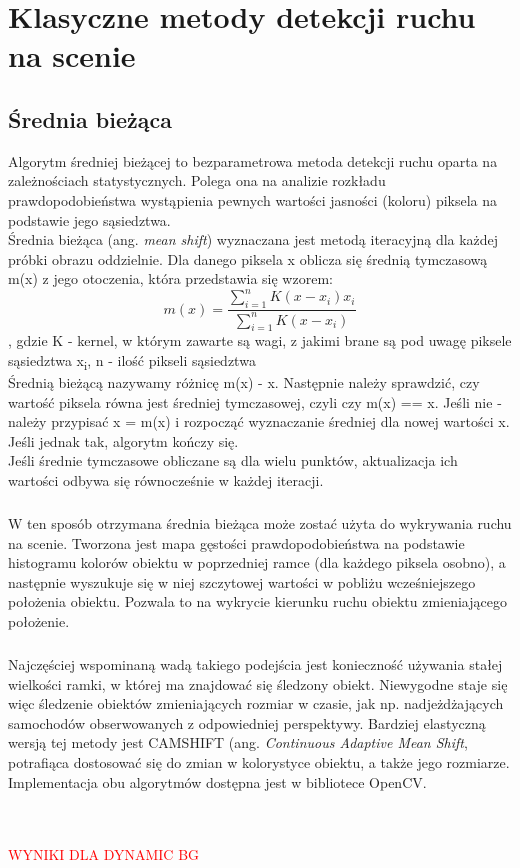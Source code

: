 \chapter{Klasyczne metody detekcji ruchu na scenie}
\label{cha:metodyStare}
\section{Średnia bieżąca}
Algorytm średniej bieżącej to bezparametrowa metoda detekcji ruchu oparta na zależnościach statystycznych. Polega ona na analizie rozkładu prawdopodobieństwa wystąpienia pewnych wartości jasności (koloru) piksela na podstawie jego sąsiedztwa.\\
\nocite{kheng2011mean}
Średnia bieżąca (ang. \textit{mean shift}) wyznaczana jest metodą iteracyjną dla każdej próbki obrazu oddzielnie. Dla danego piksela x oblicza się średnią tymczasową m(x) z jego otoczenia, która przedstawia się wzorem:
\begin{equation}
m(x) = 
\frac{\sum_{i=1}^{n}K(x-x_{i})x_{i}}{\sum_{i=1}^{n}K(x-x_{i})}
\end{equation}
, gdzie K - kernel, w którym zawarte są wagi, z jakimi brane są pod uwagę piksele sąsiedztwa x\textsubscript{i}, n - ilość pikseli sąsiedztwa \\
Średnią bieżącą nazywamy różnicę m(x) - x.
Następnie należy sprawdzić, czy wartość piksela równa jest średniej tymczasowej, czyli czy m(x) == x. Jeśli nie - należy przypisać x = m(x) i rozpocząć wyznaczanie średniej dla nowej wartości x. Jeśli jednak tak, algorytm kończy się.\\
Jeśli średnie tymczasowe obliczane są dla wielu punktów, aktualizacja ich wartości odbywa się równocześnie w każdej iteracji.
\paragraph{}
W ten sposób otrzymana średnia bieżąca może zostać użyta do wykrywania ruchu na scenie. Tworzona jest mapa gęstości prawdopodobieństwa na podstawie histogramu kolorów obiektu w poprzedniej ramce (dla każdego piksela osobno), a następnie wyszukuje się w niej szczytowej wartości w pobliżu wcześniejszego położenia obiektu. Pozwala to na wykrycie kierunku ruchu obiektu zmieniającego położenie.
\paragraph{}
Najczęściej wspominaną wadą takiego podejścia jest konieczność używania stałej wielkości ramki, w której ma znajdować się śledzony obiekt. Niewygodne staje się więc śledzenie obiektów zmieniających rozmiar w czasie, jak np. nadjeżdżających samochodów obserwowanych z odpowiedniej perspektywy. Bardziej elastyczną wersją tej metody jest CAMSHIFT (ang. \textit{Continuous Adaptive Mean Shift}, potrafiąca dostosować się do zmian w kolorystyce obiektu, a także jego rozmiarze. Implementacja obu algorytmów dostępna jest w bibliotece OpenCV.\\ \\ \\
\begin{LARGE}
\textcolor{red}{WYNIKI DLA DYNAMIC BG}
\end{LARGE}

